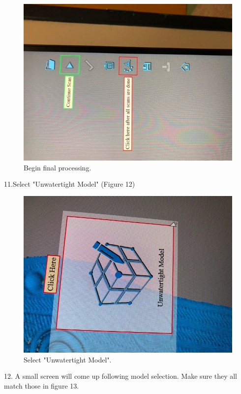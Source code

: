 \begin{figure}[!htp]
\centering
\includegraphics[scale=.75, angle=270]{3D_Finalize_2}
\caption{Begin final processing.}
\label{Image 11}
\end{figure}

\newpage

11.Select "Unwatertight Model" (Figure 12)

\begin{figure}[!htp]
\centering
\includegraphics[scale=1, angle=270]{3D_Unwatered}
\caption{Select "Unwatertight Model". }
\label{Image 12}
\end{figure}



12. A small screen will come up following model selection. Make sure they all match those in figure 13.

